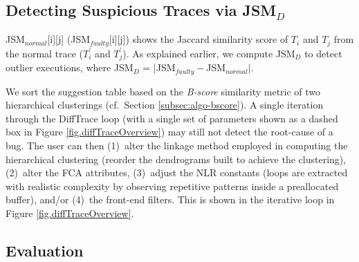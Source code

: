\subsection{Detecting Suspicious Traces via JSM$_{D}$}
JSM$_{normal}$[i][j] (JSM$_{faulty}$[i][j]) shows the Jaccard similarity score of $T_i$ and $T_j$ from the normal trace ($T_i^\prime$ and $T_j^\prime$).
% 
%
As explained earlier, we compute
JSM$_{D}$ to detect outlier executions, where
JSM$_{D}$ = $|$JSM$_{faulty} - $JSM$_{normal}|$.

%
We sort the suggestion table based on the \textit{B-score}
similarity metric of two hierarchical clusterings \cite{fowlkes83} (cf.~Section \ref{subsec:algo-bscore}).
%
A single iteration through the
DiffTrace loop
(with a single set of parameters shown as a dashed box in Figure \ref{fig.diffTraceOverview})
may still not detect the root-cause of a bug.
%
The user can then (1)~alter the linkage method employed in computing the hierarchical clustering
(reorder the dendrograms built to achieve the clustering),
(2)~alter the FCA attributes, (3)~adjust the NLR constants (loops are extracted with
realistic complexity by observing repetitive patterns inside a preallocated buffer),
and/or (4)~the front-end filters.
%
This is shown in the iterative loop in
Figure \ref{fig.diffTraceOverview}.

\subsection{Evaluation}

%

%
%

